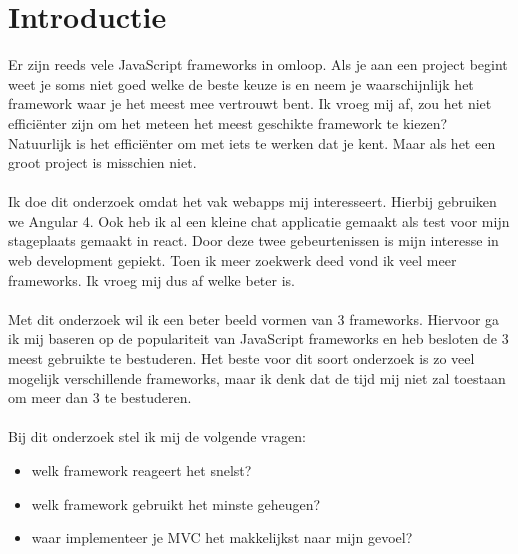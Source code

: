 \documentclass[fleqn,10pt]{voorstel}
\affiliation{\textbf{Contact:}
  \textsuperscript{1} \href{mailto:jef.braem.w9675@student.hogent.be}{jef.braem.w9675@student.hogent.be}}
\begin{document}
\flushbottom %
\maketitle %
\thispagestyle{empty} %



\section{Introductie} %
\label{sec:introductie}
Er zijn reeds vele JavaScript frameworks in omloop. Als je aan een project begint weet je soms niet goed welke de beste keuze is en neem je waarschijnlijk het framework waar je het meest mee vertrouwt bent. Ik vroeg mij af, zou het niet efficiënter zijn om het meteen het meest geschikte framework te kiezen? Natuurlijk is het efficiënter om met iets te werken dat je kent. Maar als het een groot project is misschien niet.\\
\\
Ik doe dit onderzoek omdat het vak webapps mij interesseert. Hierbij gebruiken we Angular 4. Ook heb ik al een kleine chat applicatie gemaakt als test voor mijn stageplaats gemaakt in react. Door deze twee gebeurtenissen is mijn interesse in web development gepiekt. Toen ik meer zoekwerk deed vond ik veel meer frameworks. Ik vroeg mij dus af welke beter is.\\
\\
Met dit onderzoek wil ik een beter beeld vormen van 3 frameworks. Hiervoor ga ik mij baseren op de populariteit van JavaScript frameworks en heb besloten de 3 meest gebruikte te bestuderen. Het beste voor dit soort onderzoek is zo veel mogelijk verschillende frameworks, maar ik denk dat de tijd mij niet zal toestaan om meer dan 3 te bestuderen.\\
\\
Bij dit onderzoek stel ik mij de volgende vragen:
\begin{itemize}
	\item welk framework reageert het snelst?
	\item welk framework gebruikt het minste geheugen?
	\item waar implementeer je MVC het makkelijkst naar mijn gevoel?
\end{itemize}
\end{document}
